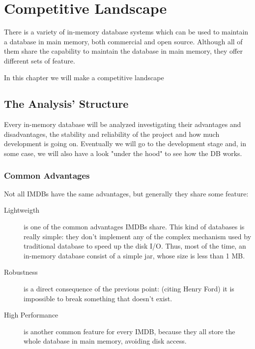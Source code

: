 \chapter{Competitive Landscape}
	There is a variety of in-memory database systems which can be used to maintain a 
	database in main memory, both commercial and open source. Although all of them share the capability 
	to maintain the database in main memory, they offer different sets of feature. 
	
	In this chapter we will make a competitive landscape		
	
	\section{The Analysis' Structure}
	Every in-memory database will be analyzed investigating 
	their advantages and disadvantages, the stability and reliability of the project 
	and how much development is going on. Eventually we will go to the development stage and, 
	in some case, we will also have a look "under the hood" to see how the DB works.
	
	\subsection{Common Advantages}
	Not all IMDBs have the same advantages, but generally they share some feature:
	
\begin{description}
	\item[Lightweigth] is one of the common advantages IMDBs share. This kind of databases is really simple: they 
	don't implement any of the complex mechanism used by traditional database to speed up the disk I/O. Thus, 
	most of the time, an in-memory database consist of a simple jar, whose size is less than 1 MB. 
	\item[Robustness] is a direct consequence of the previous point: (citing Henry Ford) it is impossible to 
	break something that doesn't exist.
	\item[High Performance] is another common feature for every IMDB, because they all store the whole database 
	in main memory, avoiding disk access.
\end{description}
	
